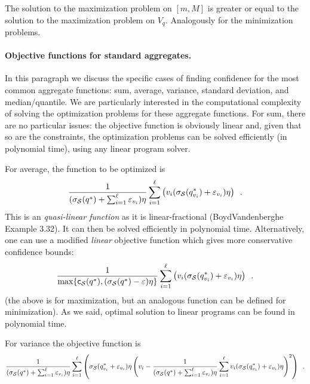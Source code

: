 \begin{corollary}
  The solution to the maximization problem on $[m,M]$ is greater or equal to the
  solution to the maximization problem on $V_q$. Analogously for the
  minimization problems.
\end{corollary}

\paragraph{Objective functions for standard aggregates.}
In this paragraph we
discuss the specific cases of finding confidence for the most common aggregate
functions: sum, average, variance, standard deviation, and median/quantile. We
are particularly interested in the computational complexity of solving the
optimization problems for these aggregate functions.
For sum, there are no particular issues: the objective function is obviously
linear and, given that so are the constraints, the optimization problems can be
solved efficiently (in polynomial time), using any linear program
solver\citemissing.

For average, the function to be optimized is
\[
\frac{1}{(\sigma_{\cal S}(q^*)+\sum_{i=1}^\ell\varepsilon_{v_i})\eta}\sum_{i=1}^\ell
\left(v_i(\sigma_{\cal S}(q^*_{v_i})+\varepsilon_{v_i})\eta\right)\enspace.
\]
This is an \emph{quasi-linear function} as it is linear-fractional\citemissing
(BoydVandenberghe Example 3.32). It can then be solved efficiently in polynomial
time\citemissing {}. Alternatively, one
can use a modified \emph{linear} objective function which gives more
conservative confidence bounds:
\[
\frac{1}{\max\{\mathsf{c}_{\cal S}(q^*),(\sigma_{\cal S}(q^*)-\varepsilon)\eta\}}\sum_{i=1}^\ell
\left(v_i(\sigma_{\cal S}(q^*_{v_i})+\varepsilon_{v_i})\eta\right)\enspace.
\]
(the above is for maximization, but an analogous function can be defined for
minimization). As we said, optimal solution to linear programs can be found in
polynomial time.

For variance the objective function is
\[
\frac{1}{(\sigma_{\cal S}(q^*)+\sum_{i=1}^\ell\varepsilon_{v_i})\eta}\sum_{i=1}^\ell
\left(\sigma_{\cal S}(q^*_{v_i}+\varepsilon_{v_i})\eta\left(v_i - \frac{1}{(\sigma_{\cal S}(q^*)+\sum_{i=1}^\ell\varepsilon_{v_i})\eta}\sum_{i=1}^\ell
v_i(\sigma_{\cal S}(q^*_{v_i})+\varepsilon_{v_i})\eta \right)^2\right)\enspace.
\]

